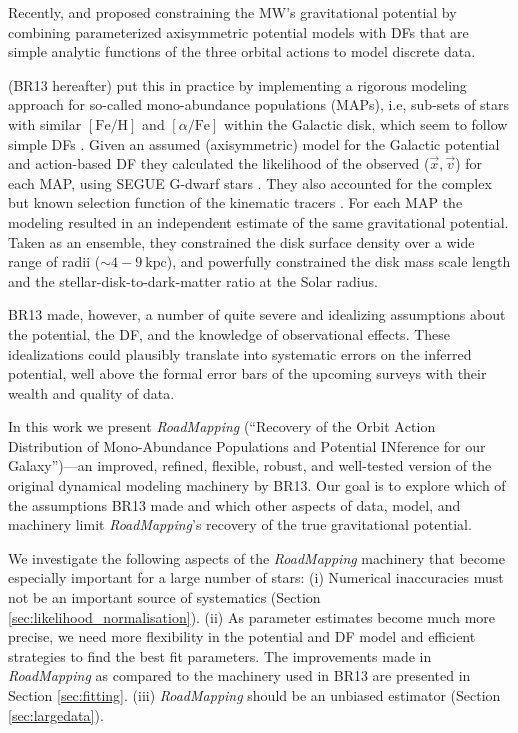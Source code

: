 \documentclass[iop,revtex4,numberedappendix,appendixfloats]{emulateapj}
\newcommand{\MAP}{MAP}
\newcommand{\MAPs}{MAPs}
\newcommand{\RM}{{\sl RoadMapping}}
\begin{document}
Recently, \citet{2012MNRAS.426.1328B} and \citet{2013ApJ...779..115B} proposed constraining the MW's gravitational potential by combining parameterized axisymmetric potential models with DFs that are simple analytic functions of the three orbital actions to model discrete data.

\citet{2013ApJ...779..115B} (BR13 hereafter) put this in practice by implementing a rigorous modeling approach for so-called mono-abundance populations (\MAPs{}), i.e, sub-sets of stars with similar $[\mathrm{Fe}/\mathrm{H}]$ and $[\alpha/\mathrm{Fe}]$ within the Galactic disk, which seem to follow simple DFs \citep{2012ApJ...751..131B,2012ApJ...755..115B,2012ApJ...753..148B}. Given an assumed (axisymmetric) model for the Galactic potential and action-based DF \citep{2010MNRAS.401.2318B,2011MNRAS.413.1889B,2013MNRAS.434..652T} they calculated the likelihood of the observed ($\vec{x},\vec{v}$) for each \MAP{}, using SEGUE G-dwarf stars \citep{2009AJ....137.4377Y}. They also accounted for the complex but known selection function of the kinematic tracers \citep{2012ApJ...753..148B}. For each \MAP{} the modeling resulted in an independent estimate of the same gravitational potential. Taken as an ensemble, they constrained the disk surface density over a wide range of radii ($\sim 4-9~\text{kpc}$), and powerfully constrained the disk mass scale length and the stellar-disk-to-dark-matter ratio at the Solar radius. 

BR13 made, however, a number of quite severe and idealizing assumptions about the potential, the DF, and the knowledge of observational effects. These idealizations could plausibly translate into systematic errors on the inferred potential, well above the formal error bars of the upcoming surveys with their wealth and quality of data.

In this work we present \RM{} (``\textsc{R}ecovery of the \textsc{O}rbit \textsc{A}ction \textsc{D}istribution of \textsc{M}ono-\textsc{A}bundance \textsc{P}opulations and \textsc{P}otential \textsc{IN}ference for our \textsc{G}alaxy'')---an improved, refined, flexible, robust, and well-tested version of the original dynamical modeling machinery by BR13. Our goal is to explore which of the assumptions BR13 made and which other aspects of data, model, and machinery limit \RM{}'s recovery of the true gravitational potential.

We investigate the following aspects of the \RM{} machinery that become especially important for a large number of stars: (i) Numerical inaccuracies must not be an important source of systematics (Section \ref{sec:likelihood_normalisation}). (ii) As parameter estimates become much more precise, we need more flexibility in the potential and DF model and efficient strategies to find the best fit parameters. The improvements made in \RM{} as compared to the machinery used in BR13 are presented in Section \ref{sec:fitting}. (iii) \RM{} should be an unbiased estimator (Section \ref{sec:largedata}).
\end{document}

